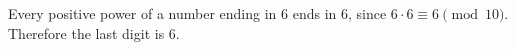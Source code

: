 Every positive power of a number ending in $6$ ends in $6$, since $6\cdot6\equiv6\pmod{10}$. Therefore the last digit is $\boxed6$.
